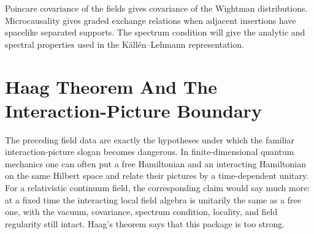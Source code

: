 Poincare covariance of the fields gives covariance of the Wightman
distributions. Microcausality gives graded exchange relations when adjacent
insertions have spacelike separated supports. The spectrum condition will give
the analytic and spectral properties used in the K\"all\'en--Lehmann
representation.

\section{Haag Theorem And The Interaction-Picture Boundary}
\label{sec:haag-theorem-interaction-picture-boundary}

The preceding field data are exactly the hypotheses under which the familiar
interaction-picture slogan becomes dangerous.  In finite-dimensional quantum
mechanics one can often put a free Hamiltonian and an interacting Hamiltonian on
the same Hilbert space and relate their pictures by a time-dependent unitary.
For a relativistic continuum field, the corresponding claim would say much more:
at a fixed time the interacting local field algebra is unitarily the same as a
free one, with the vacuum, covariance, spectrum condition, locality, and field
regularity still intact.  Haag's theorem says that this package is too strong.

